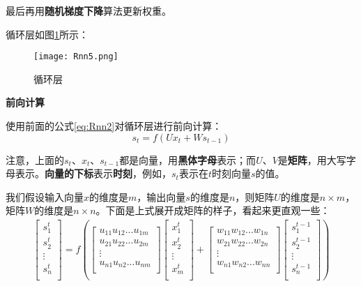 最后再用\textbf{随机梯度下降}算法更新权重。

循环层如图\ref{fig:Rnn5}所示：

\begin{figure}[!h]
	\centering
	\texttt{[image: Rnn5.png]}
	\caption{循环层}
	\label{fig:Rnn5}
\end{figure}

\textbf{前向计算}

使用前面的公式\ref{eq:Rnn2}对循环层进行前向计算：
\[
	{s}_t=f(U{x}_t+W{s}_{t-1})
\]

注意，上面的\({s}_t\)、\({x}_t\)、\({s}_{t-1}\)都是向量，用\textbf{黑体字母}表示；而$U$、$V$是\textbf{矩阵}，用大写字母表示。\textbf{向量的下标}表示\textbf{时刻}，例如，\({s}_t\)表示在$t$时刻向量$s$的值。

我们假设输入向量$x$的维度是$m$，输出向量$s$的维度是$n$，则矩阵$U$的维度是\(n\times m\)，矩阵$W$的维度是\(n\times n\)。下面是上式展开成矩阵的样子，看起来更直观一些：
\begin{align*}
	\begin{bmatrix}
		s_1^t  \\
		s_2^t  \\
		\vdots \\
		s_n^t  \\
	\end{bmatrix}=f\left(
	\begin{bmatrix}
		u_{11} u_{12} ... u_{1m} \\
		u_{21} u_{22} ... u_{2m} \\
		\vdots                   \\
		u_{n1} u_{n2} ... u_{nm} \\
	\end{bmatrix}
	\begin{bmatrix}
		x_1^t  \\
		x_2^t  \\
		\vdots \\
		x_m^t  \\
	\end{bmatrix}+
	\begin{bmatrix}
		w_{11} w_{12} ... w_{1n} \\
		w_{21} w_{22} ... w_{2n} \\
		\vdots                   \\
		w_{n1} w_{n2} ... w_{nn} \\
	\end{bmatrix}
	\begin{bmatrix}
		s_1^{t-1} \\
		s_2^{t-1} \\
		\vdots    \\
		s_n^{t-1} \\
	\end{bmatrix}\right)
\end{align*}

